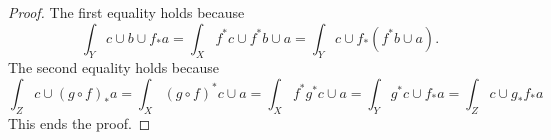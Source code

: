 \documentclass[10pt,a4paper]{amsart}
\theoremstyle{plain}
\theoremstyle{definition}
\theoremstyle{remark}
\numberwithin{equation}{subsection}
\begin{document}
\begin{proof}
The first equality holds because
$$
\int_Y c \cup b \cup f_*a =
\int_X f^*c \cup f^*b \cup a =
\int_Y c \cup f_*(f^*b \cup a).
$$
The second equality holds because
$$
\int_Z c \cup (g \circ f)_*a = \int_X (g \circ f)^*c \cup a =
\int_X f^* g^* c \cup a = \int_Y g^*c \cup f_*a = \int_Z c \cup g_*f_*a
$$
This ends the proof.
\end{proof}
\end{document}
